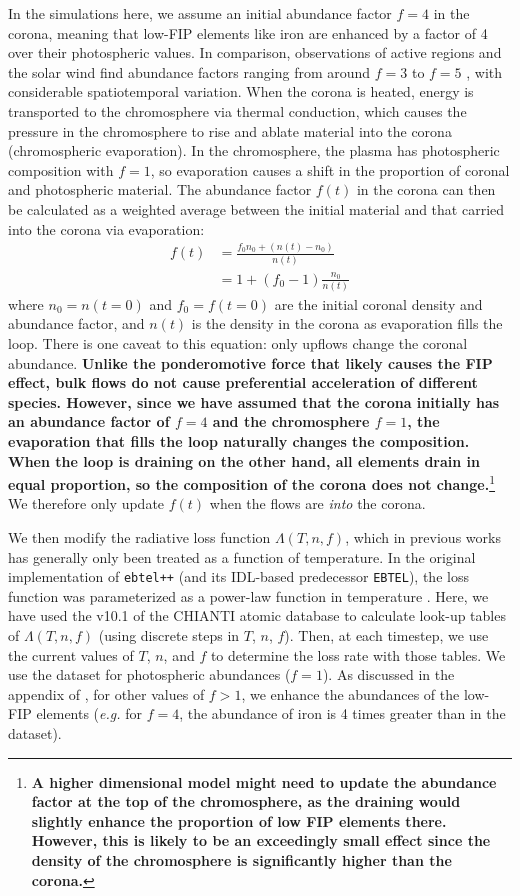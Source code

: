 \documentclass[twocolumn]{aastex631}
\begin{document}
In the simulations here, we assume an initial abundance factor $f = 4$ in the corona, meaning that low-FIP elements like iron are enhanced by a factor of 4 over their photospheric values.  In comparison, observations of active regions and the solar wind find abundance factors ranging from around $f = 3$ to $f =5$ \citep{brooks2012}, with considerable spatiotemporal variation.  When the corona is heated, energy is transported to the chromosphere via thermal conduction, which causes the pressure in the chromosphere to rise and ablate material into the corona (chromospheric evaporation).  In the chromosphere, the plasma has photospheric composition with $f = 1$, so evaporation causes a shift in the proportion of coronal and photospheric material.  The abundance factor $f(t)$ in the corona can then be calculated as a weighted average between the initial material and that carried into the corona via evaporation:
\begin{align}
    f(t) &= \frac{f_{0} n_{0} + (n(t) - n_{0})}{n(t)}  \nonumber \\
     &= 1 + (f_{0} - 1) \frac{n_{0}}{n(t)}
\end{align}
\noindent where $n_{0} = n(t=0)$ and $f_{0} = f(t=0)$ are the initial coronal density and abundance factor, and $n(t)$ is the density in the corona as evaporation fills the loop.  There is one caveat to this equation: only upflows change the coronal abundance.  \textbf{Unlike the ponderomotive force that likely causes the FIP effect, bulk flows do not cause preferential acceleration of different species.  However, since we have assumed that the corona initially has an abundance factor of $f = 4$ and the chromosphere $f = 1$, the evaporation that fills the loop naturally changes the composition.  When the loop is draining on the other hand, all elements drain in equal proportion, so the composition of the corona does not change.}\footnote{\textbf{A higher dimensional model might need to update the abundance factor at the top of the chromosphere, as the draining would slightly enhance the proportion of low FIP elements there.  However, this is likely to be an exceedingly small effect since the density of the chromosphere is significantly higher than the corona.}}  We therefore only update $f(t)$ when the flows are \textit{into} the corona.  

We then modify the radiative loss function $\Lambda(T, n, f)$, which in previous works has generally only been treated as a function of temperature.  In the original implementation of \texttt{ebtel++} (and its IDL-based predecessor \texttt{EBTEL}), the loss function was parameterized as a power-law function in temperature \citep{klimchuk2008}.  Here, we have used the v10.1 of the CHIANTI atomic database \citep{dere1997,delzanna2021} to calculate look-up tables of $\Lambda(T, n, f)$ (using discrete steps in $T$, $n$, $f$).  Then, at each timestep, we use the current values of $T$, $n$, and $f$ to determine the loss rate with those tables.  We use the \citet{asplund2009} dataset for photospheric abundances ($f=1$).  As discussed in the appendix of \citet{reep2020}, for other values of $f > 1$, we enhance the abundances of the low-FIP elements (\textit{e.g.} for $f=4$, the abundance of iron is 4 times greater than in the \citealt{asplund2009} dataset).  
\end{document}
